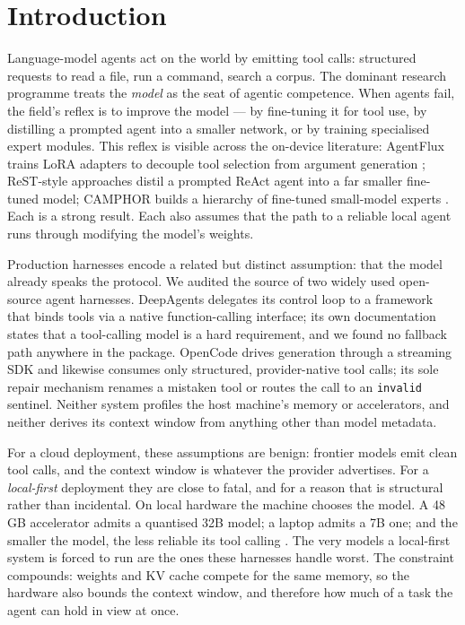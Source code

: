 \documentclass[11pt,a4paper]{article}
\begin{document}
\section{Introduction}
\label{sec:intro}

Language-model agents act on the world by emitting tool calls: structured
requests to read a file, run a command, search a corpus. The dominant research
programme treats the \emph{model} as the seat of agentic competence. When agents
fail, the field's reflex is to improve the model --- by fine-tuning it for tool
use, by distilling a prompted agent into a smaller network, or by training
specialised expert modules. This reflex is visible across the on-device
literature: AgentFlux trains LoRA adapters to decouple tool selection from
argument generation \citep{kadekodi2025agentflux}; ReST-style approaches distil
a prompted ReAct agent into a far smaller fine-tuned model; CAMPHOR builds a
hierarchy of fine-tuned small-model experts \citep{fu2025camphor}. Each is a
strong result. Each also assumes that the path to a reliable local agent runs
through modifying the model's weights.

Production harnesses encode a related but distinct assumption: that the model
already speaks the protocol. We audited the source of two widely used
open-source agent harnesses. DeepAgents \citep{deepagents} delegates its control
loop to a framework that binds tools via a native function-calling interface;
its own documentation states that a tool-calling model is a hard requirement,
and we found no fallback path anywhere in the package. OpenCode \citep{opencode}
drives generation through a streaming SDK and likewise consumes only structured,
provider-native tool calls; its sole repair mechanism renames a mistaken tool or
routes the call to an \texttt{invalid} sentinel. Neither system profiles the host
machine's memory or accelerators, and neither derives its context window from
anything other than model metadata.

For a cloud deployment, these assumptions are benign: frontier models emit
clean tool calls, and the context window is whatever the provider advertises.
For a \emph{local-first} deployment they are close to fatal, and for a reason
that is structural rather than incidental. On local hardware the machine chooses
the model. A 48\,GB accelerator admits a quantised 32B model; a laptop admits a
7B one; and the smaller the model, the less reliable its tool calling
\citep{lin2025robust,rabinovich2025robustness}. The very models a local-first
system is forced to run are the ones these harnesses handle worst. The
constraint compounds: weights and KV cache compete for the same memory, so the
hardware also bounds the context window, and therefore how much of a task the
agent can hold in view at once.
\end{document}
